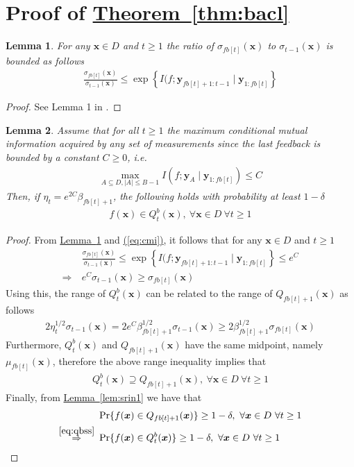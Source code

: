 \documentclass{article}
\def\*#1{\bm{#1}}
\newcommand{\theoremref}[1]{\hyperref[#1]{\mbox{Theorem~\ref*{#1}}}}
\newcommand{\lemmaref}[1]{\hyperref[#1]{\mbox{Lemma~\ref*{#1}}}}
\newcommand{\eqtref}[1]{\hyperref[#1]{\mbox{(\ref*{#1})}}}
\newtheorem{lemma}{Lemma}
\begin{document}
\section{Proof of \theoremref{thm:bacl}} \label{sect:app_bacl}
\begin{lemma}
\label{lem:cmi}
For any $\*x \in D$ and $t \geq 1$
the ratio of $\sigma_{fb[t]}(\*x)$ to $\sigma_{t-1}(\*x)$ is bounded
as follows
\begin{align*}
\frac{\sigma_{fb[t]}(\*x)}{\sigma_{t-1}(\*x)} \leq \exp\left\{I(f; \*y_{fb[t]+1:t-1} \mid \*y_{1:fb[t]}\right\}
\end{align*}
\end{lemma}
\begin{proof}
See Lemma 1 in \cite{desautels2012}.
\end{proof}

\begin{lemma}
\label{lem:batch}
Assume that for all $t \geq 1$ the maximum conditional mutual information
acquired by any set of measurements since the last feedback is bounded
by a constant $C \geq 0$, i.e.
\begin{align}
\label{eq:cmi}
\max_{A\subseteq D, |A|\leq B-1} I(f; \*y_A \mid \*y_{1:fb[t]}) \leq C
\end{align}
Then, if $\eta_t = e^{2C}\beta_{fb[t]+1}$, the following holds with probability
at least $1 - \delta$
\begin{align*}
f(\*x) \in Q_t^{b}(\*x),\ \forall \*x \in D\ \forall t \geq 1
\end{align*}
\end{lemma}
\begin{proof}
From \lemmaref{lem:cmi} and \eqtref{eq:cmi}, it follows that for any
$\*x \in D$ and $t \geq 1$
\begin{align*}
&\frac{\sigma_{fb[t]}(\*x)}{\sigma_{t-1}(\*x)} \leq \exp\left\{I(f; \*y_{fb[t]+1:t-1} \mid \*y_{1:fb[t]}\right\} \leq e^C\\
\Rightarrow\ & e^C \sigma_{t-1}(\*x) \geq \sigma_{fb[t]}(\*x)
\end{align*}
Using this, the range of $Q_t^{b}(\*x)$ can be related to the range
of $Q_{fb[t]+1}(\*x)$ as follows
\begin{align*}
2\eta_t^{1/2}\sigma_{t-1}(\*x) = 2 e^C \beta_{fb[t]+1}^{1/2}\sigma_{t-1}(\*x) \geq 2\beta_{fb[t]+1}^{1/2}\sigma_{fb[t]}(\*x)
\end{align*}
Furthermore, $Q_t^{b}(\*x)$ and $Q_{fb[t]+1}(\*x)$ have the same midpoint,
namely $\mu_{fb[t]}(\*x)$, therefore the above range inequality implies that
\begin{align}
\label{eq:qbss}
Q_t^{b}(\*x) \supseteq Q_{fb[t]+1}(\*x),\ \forall \*x \in D\ \forall t \geq 1
\end{align}
Finally, from \lemmaref{lem:srin1} we have that
\begin{align*}
&\Pr\{f(\*x) \in Q_{fb[t]+1}(\*x)\} \geq 1 - \delta,\ \forall \*x \in D\ \forall t \geq 1\\
\stackrel{\eqref{eq:qbss}}{\Rightarrow}\ & \Pr\{f(\*x) \in Q_t^{b}(\*x)\} \geq 1 - \delta,\ \forall \*x \in D\ \forall t \geq 1
\end{align*}
\end{proof}
\end{document}
